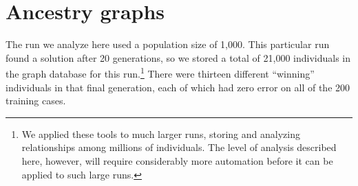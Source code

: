 \documentclass[graybox]{svmult}
\begin{document}





\section{Ancestry graphs}
\label{sec:ancestryGraphs}

The run we analyze here used a population size of 1,000. 
This particular run
found a solution after 20 generations, so we stored a total of 21,000 
individuals in the graph database for this run.\footnote{We applied these tools to much larger runs, storing and analyzing relationships among millions of individuals. The level of analysis described here, however, will require considerably more automation before it can be applied to such large runs.} There were thirteen different
``winning'' individuals in that final generation, each of which had zero
error on all of the 200 training cases.
\end{document}
